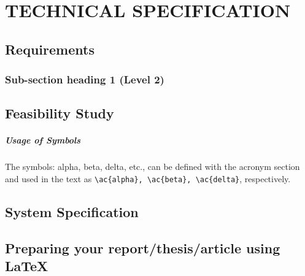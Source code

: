 \chapter{\MakeUppercase{Technical Specification}}
\label{chap:technical-specification}


\section{Requirements}
\label{sec:requirements}
\subsection{Sub-section heading 1 (Level 2)}
\label{subsec:requirements-heading-1}
\paragraph{}

\section{Feasibility Study}
\label{sec:feasibility-study}
\paragraph{Usage of Symbols} The symbols: \ac{alpha}, \ac{beta}, \ac{delta}, etc., can be defined with the acronym section and used in the text as \verb|\ac{alpha}, \ac{beta}, \ac{delta}|, respectively. 

\section{System Specification}
\label{sec:system-specification}

\section{Preparing your report/thesis/article using \LaTeX}
\label{sec:preparing-report-with-latex}
\paragraph{}
